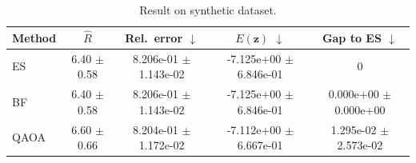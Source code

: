 \begin{table}[t]
\caption{Result on synthetic dataset.}
\label{tab:synth_metrics}
\centering
\scriptsize
\begin{tabular}{@{}lcccc@{}}
\toprule
Method & \(\hat R\) & Rel.\ error \(\downarrow\) & \(E(\mathbf{z})\) \(\downarrow\) & Gap to ES \(\downarrow\) \\
\midrule
ES & 6.40 $\pm$ 0.58 & 8.206e-01 $\pm$ 1.143e-02 & -7.125e+00 $\pm$ 6.846e-01 & 0 \\
BF & 6.40 $\pm$ 0.58 & 8.206e-01 $\pm$ 1.143e-02 & -7.125e+00 $\pm$ 6.846e-01 & 0.000e+00 $\pm$ 0.000e+00 \\
QAOA & 6.60 $\pm$ 0.66 & 8.204e-01 $\pm$ 1.172e-02 & -7.112e+00 $\pm$ 6.667e-01 & 1.295e-02 $\pm$ 2.573e-02 \\
\bottomrule
\end{tabular}
\end{table}
